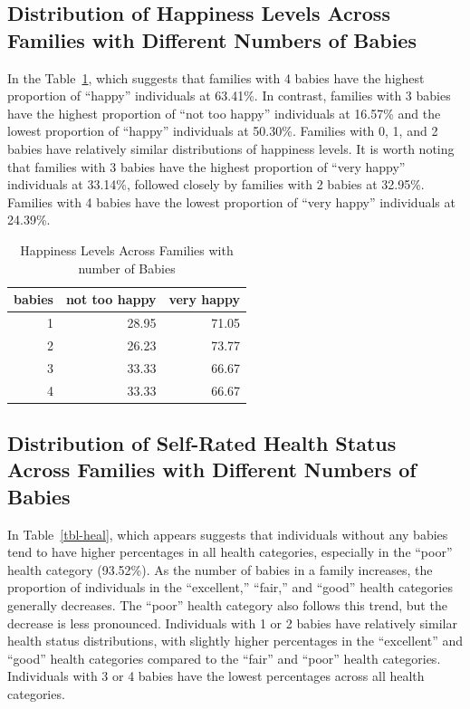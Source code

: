 \documentclass[
  letterpaper,
  DIV=11,
  numbers=noendperiod]{scrartcl}
\begin{document}
\hypertarget{distribution-of-happiness-levels-across-families-with-different-numbers-of-babies}{%
\subsection{Distribution of Happiness Levels Across Families with
Different Numbers of
Babies}\label{distribution-of-happiness-levels-across-families-with-different-numbers-of-babies}}

In the Table~\ref{tbl-happ}, which suggests that families with 4 babies
have the highest proportion of ``happy'' individuals at 63.41\%. In
contrast, families with 3 babies have the highest proportion of ``not
too happy'' individuals at 16.57\% and the lowest proportion of
``happy'' individuals at 50.30\%. Families with 0, 1, and 2 babies have
relatively similar distributions of happiness levels. It is worth noting
that families with 3 babies have the highest proportion of ``very
happy'' individuals at 33.14\%, followed closely by families with 2
babies at 32.95\%. Families with 4 babies have the lowest proportion of
``very happy'' individuals at 24.39\%.

\hypertarget{tbl-happ}{}
\begin{table}
\caption{\label{tbl-happ}Happiness Levels Across Families with number of Babies }\tabularnewline

\centering
\begin{tabular}{r|r|r}
\hline
babies & not too happy & very happy\\
\hline
1 & 28.95 & 71.05\\
\hline
2 & 26.23 & 73.77\\
\hline
3 & 33.33 & 66.67\\
\hline
4 & 33.33 & 66.67\\
\hline
\end{tabular}
\end{table}

\hypertarget{distribution-of-self-rated-health-status-across-families-with-different-numbers-of-babies}{%
\subsection{Distribution of Self-Rated Health Status Across Families
with Different Numbers of
Babies}\label{distribution-of-self-rated-health-status-across-families-with-different-numbers-of-babies}}

In Table~\ref{tbl-heal}, which appears suggests that individuals without
any babies tend to have higher percentages in all health categories,
especially in the ``poor'' health category (93.52\%). As the number of
babies in a family increases, the proportion of individuals in the
``excellent,'' ``fair,'' and ``good'' health categories generally
decreases. The ``poor'' health category also follows this trend, but the
decrease is less pronounced. Individuals with 1 or 2 babies have
relatively similar health status distributions, with slightly higher
percentages in the ``excellent'' and ``good'' health categories compared
to the ``fair'' and ``poor'' health categories. Individuals with 3 or 4
babies have the lowest percentages across all health categories.
\end{document}
